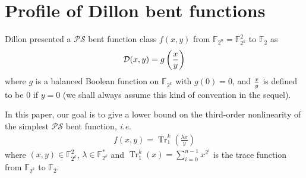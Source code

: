 \documentclass{article}
\newcommand{\F}{\mathbb{F}}
\newcommand{\TRACE}{\operatorname{Tr}_1^k}
\newtheorem{theorem}{Theorem}
\theoremstyle{nonumberplain}
\newcommand{\0}{\textbf{0}}
\newcommand{\1}{\textbf{1}}
\begin{document}

  
\section{Profile of Dillon bent functions}

    Dillon presented a $ \mathcal{PS} $ bent function class $ f(x,y) $ from $ \F_{2^n}=\F_{2^k}^2 $ 
    to $ \F_2 $ as 
    \begin{eqnarray*}\label{Eqn_PS_bent}
        \mathcal{D}(x,y)=g\left({x\over y}\right)
    \end{eqnarray*}
    where $ g $ is a balanced Boolean function on $ \F_{2^{k}} $ with $ g(0)=0 $, 
    and ${ x\over y }$ is defined to be $ 0 $ if $ y=0 $ 
    (we shall always assume this kind of convention in the sequel).

    In this paper, our goal is to give a lower bound on the third-order nonlinearity of the simplest 
    $ \mathcal{PS} $ bent function, \emph{i.e.}
    \begin{eqnarray}\label{sub-bent}
        f(x,y)=\TRACE\left(\frac{\lambda x}{y}\right)
    \end{eqnarray}
    where $ (x,y)\in\F_{2^k}^2 $, $ \lambda\in\F_{2^k}^{*} $ 
    and $ \TRACE(x)=\sum\limits_{i=0}^{n-1}x^{2^i} $ is the trace function from
    $ \F_{2^k} $ to $ \F_2 $.
\end{document}

